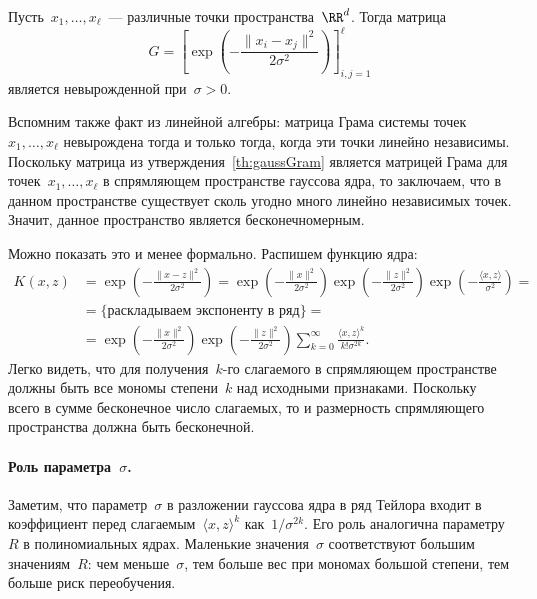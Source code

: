 \documentclass[12pt,fleqn]{article}
\begin{document}
\begin{vkState}
\label{th:gaussGram}
    Пусть~$x_1, \dots, x_\ell$~--- различные точки пространства~$\RR^d$.
    Тогда матрица
    \[
        G = \left[
            \exp\left(
                -\frac{
                    \|x_i - x_j\|^2
                }{
                    2 \sigma^2
                }
            \right)
        \right]_{i, j = 1}^{\ell}
    \]
    является невырожденной при~$\sigma > 0$.
\end{vkState}

Вспомним также факт из линейной алгебры: матрица Грама системы точек~$x_1, \dots, x_\ell$
невырождена тогда и только тогда, когда эти точки линейно независимы.
Поскольку матрица из утверждения~\ref{th:gaussGram} является матрицей Грама
для точек~$x_1, \dots, x_\ell$ в спрямляющем пространстве гауссова ядра,
то заключаем, что в данном пространстве существует сколь угодно много
линейно независимых точек.
Значит, данное пространство является бесконечномерным.

Можно показать это и менее формально.
Распишем функцию ядра:
\begin{align*}
    K(x, z)
    &=
    \exp\left(
        -\frac{
            \|x - z\|^2
        }{
            2 \sigma^2
        }
    \right)
    =
    \exp\left(
        -\frac{
            \|x\|^2
        }{
            2 \sigma^2
        }
    \right)
    \exp\left(
        -\frac{
            \|z\|^2
        }{
            2 \sigma^2
        }
    \right)
    \exp\left(
        -\frac{
            \langle x, z \rangle
        }{
            \sigma^2
        }
    \right)
    =\\
    &=
    \{\text{раскладываем экспоненту в ряд}\}
    =\\
    &=
    \exp\left(
        -\frac{
            \|x\|^2
        }{
            2 \sigma^2
        }
    \right)
    \exp\left(
        -\frac{
            \|z\|^2
        }{
            2 \sigma^2
        }
    \right)
    \sum_{k = 0}^{\infty}
        \frac{
            \langle x, z \rangle^k
        }{
            k! \sigma^{2k}
        }.
\end{align*}
Легко видеть, что для получения~$k$-го слагаемого в спрямляющем пространстве
должны быть все мономы степени~$k$ над исходными признаками.
Поскольку всего в сумме бесконечное число слагаемых, то и размерность
спрямляющего пространства должна быть бесконечной.

\paragraph{Роль параметра~$\sigma$.}
Заметим, что параметр~$\sigma$ в разложении гауссова ядра
в ряд Тейлора входит в коэффициент перед слагаемым~$\langle x, z \rangle^k$
как~$1 / \sigma^{2k}$.
Его роль аналогична параметру~$R$ в полиномиальных ядрах.
Маленькие значения~$\sigma$ соответствуют большим значениям~$R$:
чем меньше~$\sigma$, тем больше вес при мономах большой степени, тем
больше риск переобучения.
\end{document}
